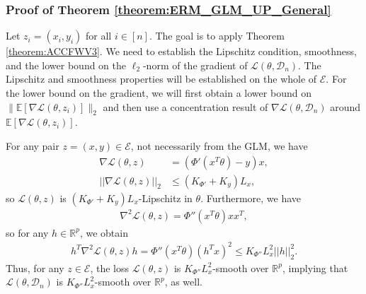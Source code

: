 \documentclass{article}
\begin{document}

\subsubsection{Proof of Theorem \ref{theorem:ERM_GLM_UP_General}}
\label{AppThmERM}

Let $z_i = (x_i, y_i)$ for all $i \in [n]$. The goal is to apply Theorem \ref{theorem:ACCFWV3}. We need to establish the Lipschitz condition, smoothness, and the lower bound on the $\ell_2$-norm of the gradient of $\mathcal{L}(\theta, \mathcal{D}_n)$. The Lipschitz and smoothness properties will be established on the whole of $\mathcal{E}$. For the lower bound on the gradient, we will first obtain a lower bound on $\|\mathbb{E}[\nabla \mathcal{L}(\theta, z_i)]\|_2$ and then use a concentration result of $\nabla \mathcal{L}(\theta, \mathcal{D}_n)$ around $\mathbb{E}[\nabla \mathcal{L}(\theta, z_i)]$.

For any pair $z = (x, y) \in \mathcal{E}$, not necessarily from the GLM, we have
\begin{align*}
\nabla \mathcal{L}(\theta, z) & = (\Phi'(x^T\theta) - y)x,\\
||\nabla \mathcal{L}(\theta, z)||_2 & \leq (K_{\Phi'} + K_y)L_x,
\end{align*}
so $\mathcal{L}(\theta, z)$ is $(K_{\Phi'} + K_y)L_x$-Lipschitz in $\theta$. Furthermore, we have
\begin{align*}
\nabla^2 \mathcal{L}(\theta, z) = \Phi''(x^T\theta)xx^T,
\end{align*}
so for any $h \in \mathbb{R}^p$, we obtain
\begin{align*}
h^T\nabla^2 \mathcal{L}(\theta, z)h = \Phi''(x^T\theta)(h^Tx)^2 \leq K_{\Phi''}L_x^2||h||_2^2.
\end{align*} 
Thus, for any $z \in \mathcal{E}$, the loss $\mathcal{L}(\theta, z)$ is $K_{\Phi''}L_x^2$-smooth over $\mathbb{R}^p$, implying that $\mathcal{L}(\theta, \mathcal{D}_n)$ is $K_{\Phi''}L_x^2$-smooth over $\mathbb{R}^p$, as well.
\end{document}
